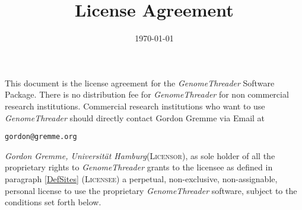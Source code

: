 \documentclass[12pt]{article}
\title{\Software License Agreement\Noncommercial}
\author{\vspace*{-1cm}}
\date{\vspace*{-1cm}\today}
\makeatletter
\newcommand{\Software}[0]{\emph{GenomeThreader}\xspace}
\newcommand{\Licensorname}[0]{\emph{Gordon Gremme, Universit\"at Hamburg}\xspace}
\newcommand{\Email}[0]{\texttt{\small gordon@gremme.org}\xspace}
\newcommand{\Persontocontact}[0]{Gordon Gremme\xspace}
\newcommand{\Licensor}[0]{\textsc{Licensor}\xspace}
\newcommand{\Licensee}[0]{\textsc{Licensee}\xspace}
\makeatother
\begin{document}
\maketitle

This document is the license agreement for the \Software Software Package.
There is no distribution fee for \Software for non commercial research
institutions. Commercial research institutions who want to use \Software
should directly contact \Persontocontact via Email at
\begin{center}
\Email
\end{center}

\Licensorname (\Licensor), as sole holder of all the proprietary rights to 
\Software grants to the licensee as defined in paragraph \ref{DefSites}
(\Licensee) a perpetual, non-exclusive, non-assignable, personal 
license to use the proprietary \Software software, subject to 
the conditions set forth below.
\end{document}
